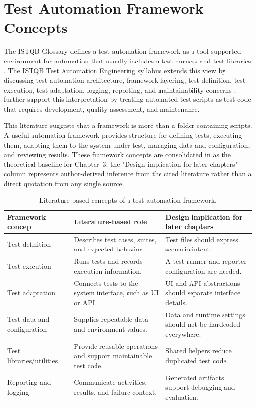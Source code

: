 \section{Test Automation Framework Concepts}
\label{sec:ch2-framework-concepts}

The ISTQB Glossary defines a test automation framework as a tool-supported environment for automation that usually includes a test harness and test libraries \autocite{istqb_glossary_test_automation_framework_2026}. The ISTQB Test Automation Engineering syllabus extends this view by discussing test automation architecture, framework layering, test definition, test execution, test adaptation, logging, reporting, and maintainability concerns \autocite{istqb_ctal_tae_syllabus_2024}. \textcite{garousi_felderer_test_scripts_2016} further support this interpretation by treating automated test scripts as test code that requires development, quality assessment, and maintenance.

This literature suggests that a framework is more than a folder containing scripts. A useful automation framework provides structure for defining tests, executing them, adapting them to the system under test, managing data and configuration, and reviewing results. These framework concepts are consolidated in  as the theoretical baseline for Chapter~3; the "Design implication for later chapters" column represents author-derived inference from the cited literature rather than a direct quotation from any single source.

\begin{table}[htbp]
  \centering
  \tablefont
  \begin{tabularx}{\textwidth}{YYY}
    \toprule
    Framework concept & Literature-based role & Design implication for later chapters \\
    \midrule
    Test definition & Describes test cases, suites, and expected behavior. & Test files should express scenario intent. \\
    Test execution & Runs tests and records execution information. & A test runner and reporter configuration are needed. \\
    Test adaptation & Connects tests to the system interface, such as UI or API. & UI and API abstractions should separate interface details. \\
    Test data and configuration & Supplies repeatable data and environment values. & Data and runtime settings should not be hardcoded everywhere. \\
    Test libraries/utilities & Provide reusable operations and support maintainable test code. & Shared helpers reduce duplicated test code. \\
    Reporting and logging & Communicate activities, results, and failure context. & Generated artifacts support debugging and evaluation. \\
    \bottomrule
  \end{tabularx}
  \caption{Literature-based concepts of a test automation framework.}
  \label{tab:literature-based-framework-concepts}
\end{table}

